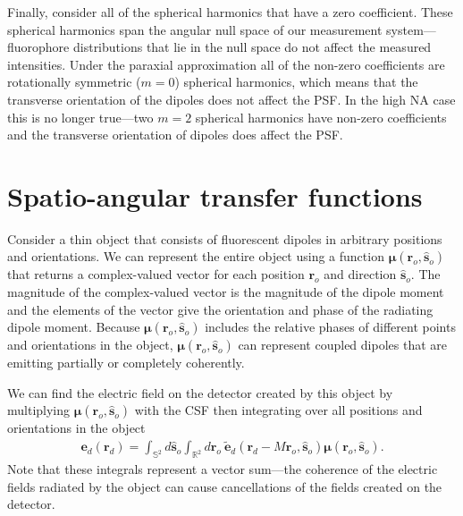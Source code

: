 \documentclass[11pt]{article}
\providecommand{\mb}[1]{\mathbf{#1}}
\providecommand{\ro}[1]{\mathbf{\mathbf{r}}_o}
\providecommand{\so}[1]{\mathbf{\hat{s}}_o}
\providecommand{\rd}[1]{\mathbf{r}_d}
\providecommand{\bs}[1]{\boldsymbol{#1}}
\begin{document}
Finally, consider all of the spherical harmonics that have a zero
coefficient. These spherical harmonics span the angular null space of our
measurement system---fluorophore distributions that lie in the null space do not
affect the measured intensities. Under the paraxial approximation all of the
non-zero coefficients are rotationally symmetric ($m=0$) spherical harmonics,
which means that the transverse orientation of the dipoles does not affect the
PSF. In the high NA case this is no longer true---two $m=2$ spherical harmonics
have non-zero coefficients and the transverse orientation of dipoles does affect
the PSF.


\section{Spatio-angular transfer functions}
Consider a thin object that consists of fluorescent dipoles in arbitrary
positions and orientations. We can represent the entire object using a function
$\bs{\mu}(\ro{}, \so{})$ that returns a complex-valued vector for each position
$\ro{}$ and direction $\so{}$. The magnitude of the complex-valued vector is the
magnitude of the dipole moment and the elements of the vector give the orientation
and phase of the radiating dipole moment. Because $\bs{\mu}(\ro{}, \so{})$
includes the relative phases of different points and orientations in the object,
$\bs{\mu}(\ro{}, \so{})$ can represent coupled dipoles that are emitting
partially or completely coherently.

We can find the electric field on the detector created by this object by
multiplying $\bs{\mu}(\ro{}, \so{})$ with the CSF then integrating over all
positions and orientations in the object
\begin{align}
  \mb{e}_d(\rd{}) = \int_{\mathbb{S}^2}d\so{}\int_{\mathbb{R}^2}d\ro{} \ \tilde{\mb{e}}_d(\rd{} - M\mb{r}_o, \so{})\bs{\mu}(\ro{}, \so{}).\label{eq:eforward}
\end{align}
Note that these integrals represent a vector sum---the coherence of the electric
fields radiated by the object can cause cancellations of the fields created on
the detector.
\end{document}
